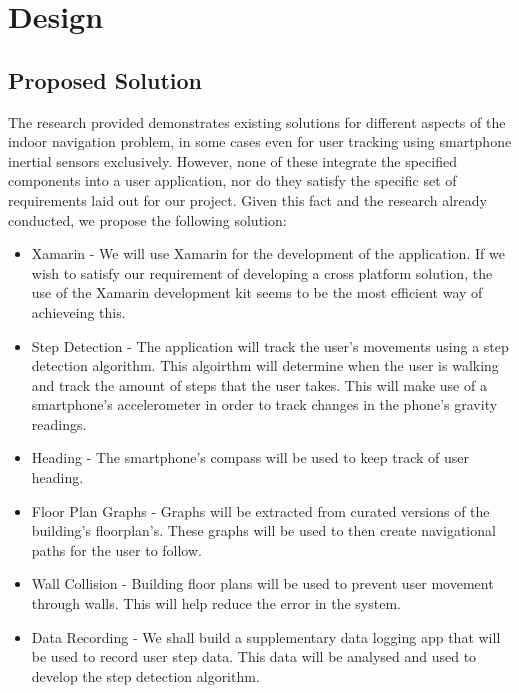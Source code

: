 \documentclass[main.tex]{subfiles}
\begin{document}
\chapter*{Design}

\section*{Proposed Solution}

The research provided demonstrates existing solutions for different aspects of the indoor navigation problem, in some cases even for user tracking using smartphone inertial sensors exclusively. However, none of these integrate the specified components into a user application, nor do they satisfy the specific set of requirements laid out for our project. 
Given this fact and the research already conducted, we propose the following solution:

\begin{itemize}

\item Xamarin - We will use Xamarin for the development of the application. If we wish to satisfy our requirement of developing a cross platform solution, the use of the Xamarin development kit seems to be the most efficient way of achieveing this.

\item Step Detection - The application will track the user's movements using a step detection algorithm. This algoirthm will determine when the user is walking and track the amount of steps that the user takes. This will make use of a smartphone's accelerometer in order to track changes in the phone's gravity readings.

\item Heading - The smartphone's compass will be used to keep track of user heading.

\item Floor Plan Graphs - Graphs will be extracted from curated versions of the building's floorplan's. These graphs will be used to then create navigational paths for the user to follow.

\item Wall Collision - Building floor plans will be used to prevent user movement through walls. This will help reduce the error in the system.

\item Data Recording - We shall build a supplementary data logging app that will be used to record user step data. This data will be analysed and used to develop the step detection algorithm.

\end{itemize}
\end{document}
